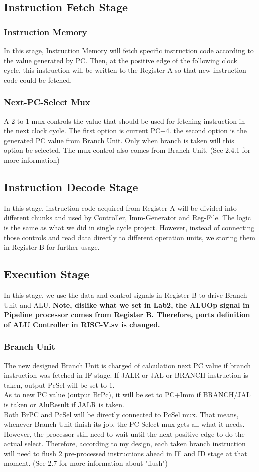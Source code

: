 \documentclass{article}
\begin{document}
	\subsection{Instruction Fetch Stage} 
	\subsubsection{Instruction Memory} 
	In this stage, Instruction Memory will fetch specific instruction code according to the value generated by PC. Then, at the positive edge of the following clock cycle, this instruction will be written to the Register A so that new instruction code could be fetched.
	\subsubsection{Next-PC-Select Mux}
	A 2-to-1 mux controls the value that should be used for fetching instruction in the next clock cycle. The first option is current PC+4. the second option is the generated PC value from Branch Unit. Only when branch is taken will this option be selected. The mux control also comes from Branch Unit. (See 2.4.1 for more information) 
	\subsection{Instruction Decode Stage}
	In this stage, instruction code acquired from Register A will be divided into different chunks and used by Controller, Imm-Generator and Reg-File. The logic is the same as what we did in single cycle project. However, instead of connecting those controls and read data directly to different operation units, we storing them in Register B for further usage.
	\subsection{Execution Stage}
	In this stage, we use the data and control signals in Register B to drive Branch Unit and ALU. \textbf{Note, dislike what we set in Lab2, the ALUOp signal in Pipeline processor comes from Register B. Therefore, ports definition of ALU Controller in RISC-V.sv is changed.}
	\subsubsection{Branch Unit}
	The new designed Branch Unit is charged of calculation next PC value if branch instruction was fetched in IF stage. If JALR or JAL or BRANCH instruction is taken, output PcSel will be set to 1. \\
	As to new PC value (output BrPc), it will be set to \underline{PC+Imm} if BRANCH/JAL is taken or \underline{AluResult} if JALR is taken. \\
	Both BrPC and PcSel will be directly connected to PcSel mux. That means, whenever Branch Unit finish its job, the PC Select mux gets all what it needs. However, the processor still need to wait until the next positive edge to do the actual select.
	Therefore, according to my design, each taken branch instruction will need to flush 2 pre-processed instructions ahead in IF and ID stage at that moment. (See 2.7 for more information about "flush")
\end{document}
